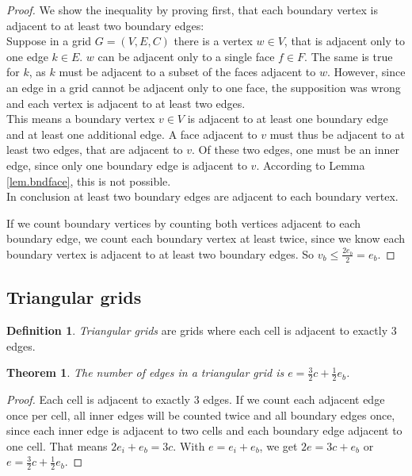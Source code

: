 \documentclass{IOS-Book-Article}
\theoremstyle{plain}
\newtheorem{theorem}{Theorem}[section]
\theoremstyle{definition}
\newtheorem{definition}{Definition}[section]
\begin{document}
\begin{proof}
We show the inequality by proving first, that each boundary vertex is adjacent to at least two boundary edges:\\
Suppose in a grid $G = (V, E, C)$ there is a vertex $w \in V$, that is adjacent only to one edge $k \in E$. $w$ can be adjacent only to a single face $f \in F$. The same is true for $k$, as $k$ must be adjacent to a subset of the faces adjacent to $w$. However, since an edge in a grid cannot be adjacent only to one face, the supposition was wrong and each vertex is adjacent to at least two edges.\\
This means a boundary vertex $v \in V$ is adjacent to at least one boundary edge and at least one additional edge.
A face adjacent to $v$ must thus be adjacent to at least two edges, that are adjacent to $v$. Of these two edges, one must be an inner edge, since only one boundary edge is adjacent to $v$. According to Lemma \ref{lem.bndface}, this is not possible.\\
In conclusion at least two boundary edges are adjacent to each boundary vertex.

If we count boundary vertices by counting both vertices adjacent to each boundary edge, we count each boundary vertex at least twice, since we know each boundary vertex is adjacent to at least two boundary edges. So $v_b \leq \frac{2 e_b}{2} = e_b$.
\end{proof}

\subsection{Triangular grids}

\begin{definition} \emph{Triangular grids} are grids where each cell is adjacent to exactly 3 edges. \end{definition}

\begin{theorem} The number of edges in a triangular grid is $e = \frac{3}{2} c + \frac{1}{2} e_b$. \end{theorem}

\begin{proof}
Each cell is adjacent to exactly 3 edges. If we count each adjacent edge once per cell, all inner edges will be counted twice and all boundary edges once, since each inner edge is adjacent to two cells and each boundary edge adjacent to one cell.
That means $2 e_i + e_b = 3 c$. With $e = e_i + e_b$, we get $2 e = 3 c + e_b$ or $e = \frac{3}{2} c + \frac{1}{2} e_b$.
\end{proof}
\end{document}
